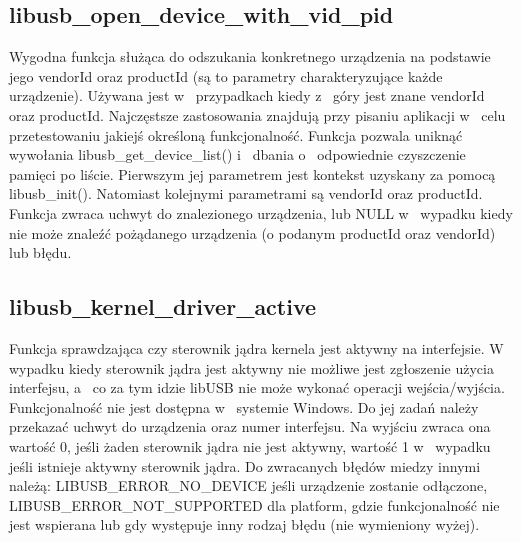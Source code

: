 \documentclass{BscUS}
\begin{document}
\subsection{libusb\_open\_device\_with\_vid\_pid}
\indent Wygodna funkcja służąca do odszukania konkretnego urządzenia na podstawie jego vendorId oraz productId (są to parametry charakteryzujące każde urządzenie).
Używana jest w~ przypadkach kiedy z~ góry jest znane vendorId oraz productId. Najczęstsze zastosowania znajdują przy pisaniu aplikacji w~ celu przetestowaniu jakiejś określoną funkcjonalność. Funkcja pozwala uniknąć wywołania libusb\_get\_device\_list() i~ dbania o~ odpowiednie czyszczenie pamięci po liście.
Pierwszym jej parametrem jest kontekst uzyskany za pomocą libusb\_init().
Natomiast kolejnymi parametrami są vendorId oraz productId.
Funkcja zwraca uchwyt do znalezionego urządzenia, lub NULL w~ wypadku kiedy nie może znaleźć pożądanego urządzenia (o podanym productId oraz vendorId) lub błędu.
\subsection{libusb\_kernel\_driver\_active}
\indent Funkcja sprawdzająca czy sterownik jądra kernela jest aktywny na interfejsie.
W wypadku kiedy sterownik jądra jest aktywny nie możliwe jest zgłoszenie użycia interfejsu, a~ co za tym idzie libUSB nie może wykonać operacji wejścia/wyjścia.
Funkcjonalność nie jest dostępna w~ systemie Windows.
Do jej zadań należy przekazać uchwyt do urządzenia oraz numer interfejsu.
Na wyjściu zwraca ona wartość 0, jeśli żaden sterownik jądra nie jest aktywny, wartość 1 w~ wypadku jeśli istnieje aktywny sterownik jądra.
\newline
Do zwracanych błędów miedzy innymi należą: LIBUSB\_ERROR\_NO\_DEVICE jeśli urządzenie zostanie odłączone, LIBUSB\_ERROR\_NOT\_SUPPORTED dla platform, gdzie funkcjonalność nie jest wspierana lub gdy występuje inny rodzaj błędu (nie wymieniony wyżej).
\end{document}
